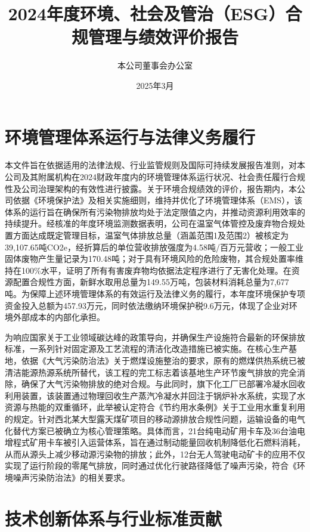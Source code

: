 \documentclass[a4paper,12pt]{article}
\title{\textbf{2024年度环境、社会及管治（ESG）合规管理与绩效评价报告}}
\author{本公司董事会办公室}
\date{2025年3月}
\begin{document}
\maketitle

\section{环境管理体系运行与法律义务履行}

本文件旨在依据适用的法律法规、行业监管规则及国际可持续发展报告准则，对本公司及其附属机构在2024财政年度内的环境管理体系运行状况、社会责任履行合规性及公司治理架构的有效性进行披露。关于环境合规绩效的评价，报告期内，本公司依据《环境保护法》及相关实施细则，维持并优化了环境管理体系（EMS），该体系的运行旨在确保所有污染物排放均处于法定限值之内，并推动资源利用效率的持续提升。经核准的年度环境监测数据表明，公司在温室气体管控及废弃物合规处置方面达成既定管理目标，温室气体排放总量（涵盖范围1及范围2）被核定为39,107.65吨CO2e，经折算后的单位营收排放强度为4.58吨/百万元营收；一般工业固体废物产生量记录为170.48吨；对于具有环境风险的危险废物，其合规处置率维持在100\%水平，证明了所有有害废弃物均依据法定程序进行了无害化处理。在资源配置合规性方面，新鲜水取用总量为149.55万吨，包装材料消耗总量为7,677吨。为保障上述环境管理体系的有效运行及法律义务的履行，本年度环境保护专项资金投入总额为457.93万元，同时依法缴纳环境保护税9.6万元，体现了企业对环境外部成本的内部化承担。

为响应国家关于工业领域碳达峰的政策导向，并确保生产设施符合最新的环保排放标准，一系列针对固定源及工艺流程的清洁化改造措施已被实施。在核心生产基地，依据《大气污染防治法》关于燃煤设施整治的要求，原有的燃煤供热系统已被清洁能源热源系统所替代，该工程的完工标志着该基地生产环节废气排放的完全消除，确保了大气污染物排放的绝对合规。与此同时，旗下化工厂已部署冷凝水回收利用装置，该装置通过物理回收生产蒸汽冷凝水并回注于锅炉补水系统，实现了水资源与热能的双重循环，此举被认定符合《节约用水条例》关于工业用水重复利用的规定。针对西北某大型露天煤矿项目的移动源排放合规性问题，运输设备的电气化替代方案已被确立为核心管理策略。具体而言，21台纯电动矿用卡车及36台油电增程式矿用卡车被引入运营体系，旨在通过制动能量回收机制降低化石燃料消耗，从而从源头上减少移动源污染物的排放；此外，12台无人驾驶电动矿卡的应用不仅实现了运行阶段的零尾气排放，同时通过优化行驶路径降低了噪声污染，符合《环境噪声污染防治法》的相关要求。

\section{技术创新体系与行业标准贡献}
\end{document}
